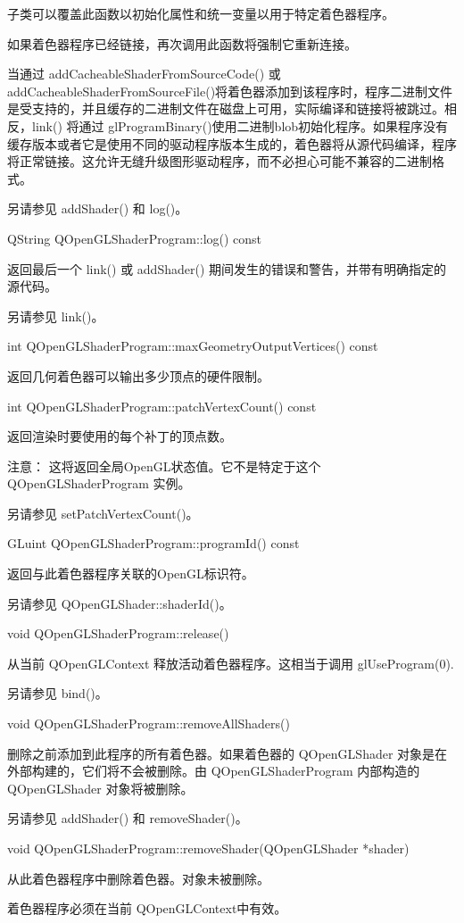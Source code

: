 子类可以覆盖此函数以初始化属性和统一变量以用于特定着色器程序。

如果着色器程序已经链接，再次调用此函数将强制它重新连接。

当通过 addCacheableShaderFromSourceCode() 或 addCacheableShaderFromSourceFile()将着色器添加到该程序时，程序二进制文件是受支持的，并且缓存的二进制文件在磁盘上可用，实际编译和链接将被跳过。相反，link() 将通过 glProgramBinary()使用二进制blob初始化程序。如果程序没有缓存版本或者它是使用不同的驱动程序版本生成的，着色器将从源代码编译，程序将正常链接。这允许无缝升级图形驱动程序，而不必担心可能不兼容的二进制格式。

另请参见 addShader() 和 log()。

QString QOpenGLShaderProgram::log() const

返回最后一个 link() 或 addShader() 期间发生的错误和警告，并带有明确指定的源代码。

另请参见 link()。

int QOpenGLShaderProgram::maxGeometryOutputVertices() const

返回几何着色器可以输出多少顶点的硬件限制。

int QOpenGLShaderProgram::patchVertexCount() const

返回渲染时要使用的每个补丁的顶点数。

注意： 这将返回全局OpenGL状态值。它不是特定于这个 QOpenGLShaderProgram 实例。

另请参见 setPatchVertexCount()。

GLuint QOpenGLShaderProgram::programId() const

返回与此着色器程序关联的OpenGL标识符。

另请参见 QOpenGLShader::shaderId()。

void QOpenGLShaderProgram::release()

从当前 QOpenGLContext 释放活动着色器程序。这相当于调用 glUseProgram(0).

另请参见 bind()。

void QOpenGLShaderProgram::removeAllShaders()

删除之前添加到此程序的所有着色器。如果着色器的 QOpenGLShader 对象是在外部构建的，它们将不会被删除。由 QOpenGLShaderProgram 内部构造的 QOpenGLShader 对象将被删除。

另请参见 addShader() 和 removeShader()。

void QOpenGLShaderProgram::removeShader(QOpenGLShader *shader)

从此着色器程序中删除着色器。对象未被删除。

着色器程序必须在当前 QOpenGLContext中有效。

